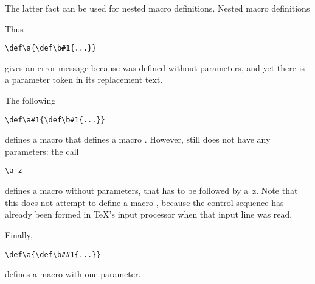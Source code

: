\documentclass[letterpaper]{book}
\begin{document}
The latter fact can be used for nested macro definitions.
\label{nest:def}\howto Nested macro definitions\par
Thus
\begin{verbatim}
\def\a{\def\b#1{...}}
\end{verbatim}
gives an error message
because  was defined without parameters, and
yet there is a parameter token in its replacement text.

The following
\begin{verbatim}
\def\a#1{\def\b#1{...}}
\end{verbatim}
defines a macro  that
defines a macro . However,  still does not
have any parameters: the call
\begin{verbatim}
\a z
\end{verbatim}
defines a macro  without parameters,
that has to be followed by a~\n z.
Note that this
does not attempt to define a macro , because the
control sequence  has already been formed in \TeX's
input processor when that input line was read.

Finally,
\begin{verbatim}
\def\a{\def\b##1{...}}
\end{verbatim}
defines a macro  
with one parameter.
\end{document}
